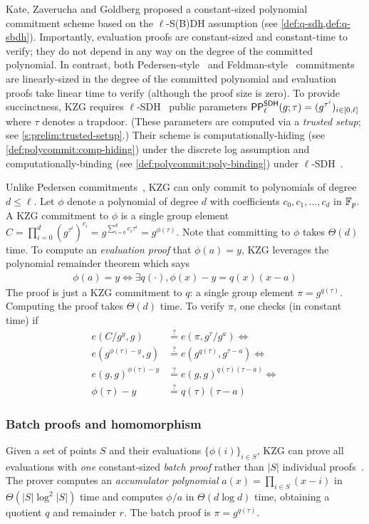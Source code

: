 Kate, Zaverucha and Goldberg proposed a constant-sized polynomial commitment scheme based on the $\ell$-S(B)DH assumption (see \cref{def:q-sdh,def:q-sbdh}).
Importantly, evaluation proofs are constant-sized and constant-time to verify; they do not depend in any way on the degree of the committed polynomial.
In contrast, both Pedersen-style~\cite{Pedersen1991Non} and Feldman-style~\cite{Feldman87} commitments are linearly-sized in the degree of the committed polynomial and evaluation proofs take linear time to verify (although the proof size is zero).
To provide succinctness, KZG requires $\ell$-SDH~\cite{BB08} public parameters $\mathsf{PP}^\mathsf{SDH}_\ell(g;\tau)=(g^{\tau^i})_{i\in[0,\ell]}$ where $\tau$ denotes a trapdoor.
(These parameters are computed via a \textit{trusted setup}; see \cref{s:prelim:trusted-setup}.)
Their scheme is computationally-hiding (see \cref{def:polycommit:comp-hiding}) under the discrete log assumption and computationally-binding (see \cref{def:polycommit:poly-binding}) under $\ell$-SDH~\cite{KZG10a}.

Unlike Pedersen commitments~\cite{Pedersen1991Non}, KZG can only commit to polynomials of degree $d\le \ell$.
Let $\phi$ denote a polynomial of degree $d$ with coefficients $c_0, c_1, \dots, c_d$ in $\mathbb{F}_p$.
A KZG commitment to $\phi$ is a single group element $C = \prod_{i=0}^d {\left(g^{\tau^i}\right)^{c_i}} = g^{\sum_{i=0}^d c_i \tau^i} = g^{\phi(\tau)}$.
Note that committing to $\phi$ takes $\Theta(d)$ time.
To compute an \textit{evaluation proof} that $\phi(a) = y$, KZG leverages the polynomial remainder theorem which says
\begin{align}
    \phi(a) = y \Leftrightarrow \exists q(\cdot), \phi(x) - y = q(x)(x-a)
    \label{eq:poly-rem-thm}
\end{align}
The proof is just a KZG commitment to $q$: a single group element $\pi=g^{q(\tau)}$.
Computing the proof takes $\Theta(d)$ time.
To verify $\pi$, one checks (in constant time) if 
\begin{align*}
e(C / g^y, g)            &\stackrel{?}{=} e(\pi, g^{\tau}/g^a) \Leftrightarrow\\
e(g^{\phi(\tau) - y}, g) &\stackrel{?}{=} e(g^{q(\tau)},g^{\tau-a})\Leftrightarrow\\
e(g,g)^{\phi(\tau)-y}    &\stackrel{?}{=} e(g,g)^{q(\tau)(\tau-a)} \Leftrightarrow\\
{\phi(\tau)-y}           &\stackrel{?}{=} q(\tau)(\tau-a)
\end{align*}

\subsubsection{Batch proofs and homomorphism}
\label{s:prelim:polycommit:kzg:batch}
\label{s:prelim:polycommit:kzg:homomorphism}
Given a set of points $S$ and their evaluations $\{\phi(i)\}_{i\in S}$, KZG can prove all evaluations with \textit{one} constant-sized \textit{batch proof} rather than $|S|$ individual proofs~\cite{KZG10a}.
The prover computes an \textit{accumulator polynomial} $a(x)=\prod_{i\in S} (x-i)$ in $\Theta(|S|\log^2{|S|})$ time and computes $\phi/a$ in $\Theta(d\log{d})$ time, obtaining a quotient $q$ and remainder $r$.
The batch proof is $\pi=g^{q(\tau)}$.

